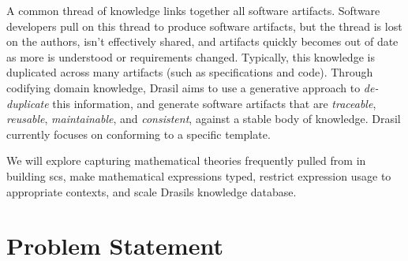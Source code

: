 \iffalse
      The usual means of building software involves multiple artifacts (such as
      specifications and code) that contain duplicate information that is also
      supposed to be linked (\textit{traceability}). Drasil aims to use a generative
      approach to de-duplicate this information and make traceability more immediate.
\fi

A common thread of knowledge links together all software artifacts. Software
developers pull on this thread to produce software artifacts, but the thread is
lost on the authors, isn't effectively shared, and artifacts quickly becomes out
of date as more is understood or requirements changed. Typically, this knowledge
is duplicated across many artifacts (such as specifications and code). Through
codifying domain knowledge, Drasil\cite{Drasil2021} aims to use a generative
approach to \textit{de-duplicate} this information, and generate software
artifacts that are \textit{traceable}, \textit{reusable}, \textit{maintainable},
and \textit{consistent}, against a stable body of knowledge. Drasil currently
focuses on  conforming to a specific 
template\cite{SmithAndLai2005}.

We will explore capturing mathematical theories frequently pulled from in
building \acs{scs}, make mathematical expressions typed, restrict expression
usage to appropriate contexts, and scale Drasils knowledge database.

\section{Problem Statement}
\label{sec:intro:problemStatement}

